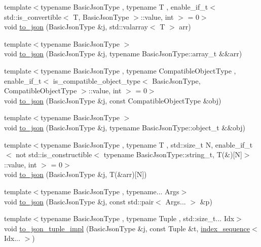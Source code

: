 \begin{DoxyCompactItemize}
\item 
{\footnotesize template$<$typename Basic\+Json\+Type , typename T , enable\+\_\+if\+\_\+t$<$ std\+::is\+\_\+convertible$<$ T, Basic\+Json\+Type $>$\+::value, int $>$  = 0$>$ }\\void \hyperlink{namespacenlohmann_1_1detail_afd18898316e9a20a6458877d2ee27d31}{to\+\_\+json} (Basic\+Json\+Type \&j, std\+::valarray$<$ T $>$ arr)
\item 
{\footnotesize template$<$typename Basic\+Json\+Type $>$ }\\void \hyperlink{namespacenlohmann_1_1detail_aa0fd1b5788e9ba37e31da43dda738cb5}{to\+\_\+json} (Basic\+Json\+Type \&j, typename Basic\+Json\+Type\+::array\+\_\+t \&\&arr)
\item 
{\footnotesize template$<$typename Basic\+Json\+Type , typename Compatible\+Object\+Type , enable\+\_\+if\+\_\+t$<$ is\+\_\+compatible\+\_\+object\+\_\+type$<$ Basic\+Json\+Type, Compatible\+Object\+Type $>$\+::value, int $>$  = 0$>$ }\\void \hyperlink{namespacenlohmann_1_1detail_a24c9c12f3839c94e09532f08de85e949}{to\+\_\+json} (Basic\+Json\+Type \&j, const Compatible\+Object\+Type \&obj)
\item 
{\footnotesize template$<$typename Basic\+Json\+Type $>$ }\\void \hyperlink{namespacenlohmann_1_1detail_ac9f7a5542851c61d93740148eaec509f}{to\+\_\+json} (Basic\+Json\+Type \&j, typename Basic\+Json\+Type\+::object\+\_\+t \&\&obj)
\item 
{\footnotesize template$<$typename Basic\+Json\+Type , typename T , std\+::size\+\_\+t N, enable\+\_\+if\+\_\+t$<$ not std\+::is\+\_\+constructible$<$ typename Basic\+Json\+Type\+::string\+\_\+t, T(\&)\mbox{[}\+N\mbox{]}$>$\+::value, int $>$  = 0$>$ }\\void \hyperlink{namespacenlohmann_1_1detail_a8c4d301fc51996e3c5c1257fb92ace20}{to\+\_\+json} (Basic\+Json\+Type \&j, T(\&arr)\mbox{[}N\mbox{]})
\item 
{\footnotesize template$<$typename Basic\+Json\+Type , typename... Args$>$ }\\void \hyperlink{namespacenlohmann_1_1detail_aa30611f74062379d3420c40487cf3bb3}{to\+\_\+json} (Basic\+Json\+Type \&j, const std\+::pair$<$ Args... $>$ \&p)
\item 
{\footnotesize template$<$typename Basic\+Json\+Type , typename Tuple , std\+::size\+\_\+t... Idx$>$ }\\void \hyperlink{namespacenlohmann_1_1detail_a510dfa15b01e9a8afe31600a27b28199}{to\+\_\+json\+\_\+tuple\+\_\+impl} (Basic\+Json\+Type \&j, const Tuple \&t, \hyperlink{structnlohmann_1_1detail_1_1index__sequence}{index\+\_\+sequence}$<$ Idx... $>$)

\end{DoxyCompactItemize}
